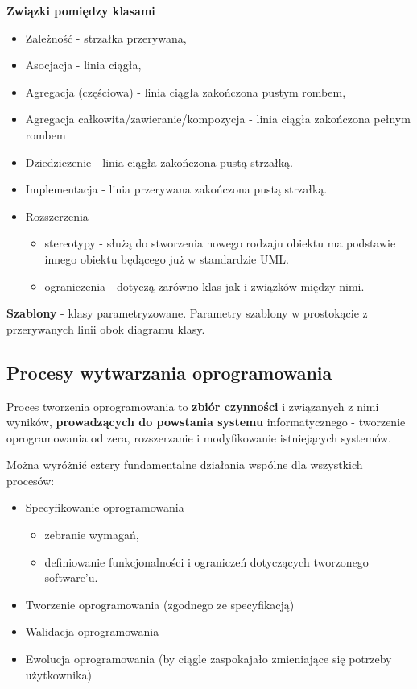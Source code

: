 \documentclass[a4paper]{article}
\begin{document}
    \textbf{Związki pomiędzy klasami}
    \begin{itemize}
        \item Zależność - strzałka przerywana,
        \item Asocjacja  - linia ciągła,
        \item Agregacja (częściowa) - linia
ciągła zakończona pustym rombem,
        \item Agregacja całkowita/zawieranie/kompozycja - linia ciągła zakończona pełnym
rombem
        \item Dziedziczenie - linia ciągła zakończona
        pustą strzałką.
        \item Implementacja - linia przerywana
        zakończona pustą strzałką.
        \\
        \item Rozszerzenia
        \begin{itemize}
            \item stereotypy - służą do stworzenia nowego
rodzaju obiektu ma podstawie innego obiektu
będącego już w standardzie UML.
            \item ograniczenia - dotyczą zarówno klas jak i
związków między nimi.
        \end{itemize}
    \end{itemize}

    \textbf{Szablony} - klasy parametryzowane. Parametry szablony w prostokącie z przerywanych linii
    obok diagramu klasy.

\subsection{Procesy wytwarzania oprogramowania}
    Proces tworzenia oprogramowania to
\textbf{zbiór czynności} i związanych z nimi
wyników, \textbf{prowadzących do powstania
systemu} informatycznego - tworzenie oprogramowania od zera,
rozszerzanie i modyfikowanie istniejących systemów.

Można wyróżnić cztery fundamentalne działania wspólne dla wszystkich procesów:
    \begin{itemize}
        \item Specyfikowanie oprogramowania
        \begin{itemize}
            \item zebranie wymagań,
            \item definiowanie funkcjonalności i ograniczeń dotyczących
tworzonego software’u.
        \end{itemize}
        \item Tworzenie oprogramowania (zgodnego ze specyfikacją)
        \item Walidacja oprogramowania
        \item Ewolucja oprogramowania (by ciągle zaspokajało zmieniające się potrzeby użytkownika)
    \end{itemize}
\end{document}

